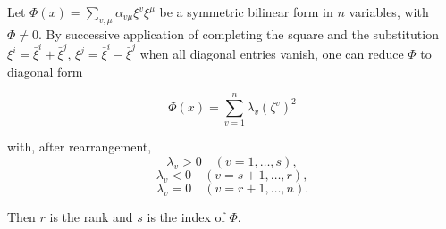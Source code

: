 Let $\Phi(x) = \sum_{v,\mu} \alpha_{v\mu} \xi^v \xi^\mu$ be a symmetric bilinear form in $n$ variables, with $\Phi \neq 0$. By successive application of completing the square and the substitution $\xi^i = \bar{\xi}^i + \bar{\xi}^j$, $\xi^j = \bar{\xi}^i - \bar{\xi}^j$ when all diagonal entries vanish, one can reduce $\Phi$ to diagonal form

$$\Phi(x) = \sum_{v=1}^n \lambda_v (\zeta^v)^2$$

with, after rearrangement,
$$\lambda_v > 0 \quad (v = 1, \ldots, s),$$
$$\lambda_v < 0 \quad (v = s+1, \ldots, r),$$
$$\lambda_v = 0 \quad (v = r+1, \ldots, n).$$

Then $r$ is the rank and $s$ is the index of $\Phi$.
